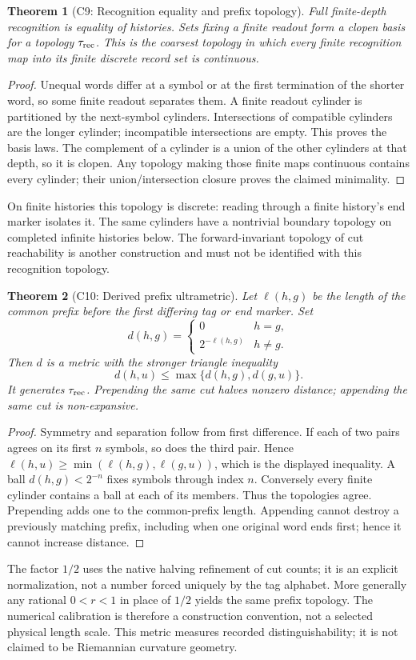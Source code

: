 \documentclass[11pt]{article}
\newtheorem{theorem}{Theorem}[section]
\begin{document}
\begin{theorem}[C9: Recognition equality and prefix topology]
\label{thm:topology}
Full finite-depth recognition is equality of histories. Sets fixing a finite
readout form a clopen basis for a topology $\tau_{\rm rec}$. This is the
coarsest topology in which every finite recognition map into its finite
discrete record set is continuous.
\end{theorem}
\begin{proof}
Unequal words differ at a symbol or at the first termination of the shorter
word, so some finite readout separates them. A finite readout cylinder is
partitioned by the next-symbol cylinders. Intersections of compatible
cylinders are the longer cylinder; incompatible intersections are empty.
This proves the basis laws. The complement of a cylinder is a union of the
other cylinders at that depth, so it is clopen. Any topology making those
finite maps continuous contains every cylinder; their union/intersection
closure proves the claimed minimality.
\end{proof}
On finite histories this topology is discrete: reading through a finite
history's end marker isolates it. The same cylinders have a nontrivial
boundary topology on completed infinite histories below. The forward-invariant
topology of cut reachability is another construction and must not be
identified with this recognition topology.

\begin{theorem}[C10: Derived prefix ultrametric]
\label{thm:metric}
Let $\ell(h,g)$ be the length of the common prefix before the first
differing tag or end marker. Set
\[
d(h,g)=\begin{cases}0&h=g,\\2^{-\ell(h,g)}&h\ne g.\end{cases}
\]
Then $d$ is a metric with the stronger triangle inequality
\[
d(h,u)\le\max\{d(h,g),d(g,u)\}.
\]
It generates $\tau_{\rm rec}$. Prepending the same cut halves nonzero
distance; appending the same cut is non-expansive.
\end{theorem}
\begin{proof}
Symmetry and separation follow from first difference. If each of two pairs
agrees on its first $n$ symbols, so does the third pair. Hence
$\ell(h,u)\ge\min(\ell(h,g),\ell(g,u))$, which is the displayed inequality.
A ball $d(h,g)<2^{-n}$ fixes symbols through index $n$. Conversely every
finite cylinder contains a ball at each of its members. Thus the topologies
agree. Prepending adds one to the common-prefix length. Appending cannot
destroy a previously matching prefix, including when one original word ends
first; hence it cannot increase distance.
\end{proof}
The factor $1/2$ uses the native halving refinement of cut counts; it is an
explicit normalization, not a number forced uniquely by the tag alphabet.
More generally any rational $0<r<1$ in place of $1/2$ yields the same prefix
topology. The numerical calibration is therefore a construction convention,
not a selected physical length scale. This metric measures recorded
distinguishability; it is not claimed to be Riemannian curvature geometry.
\end{document}
